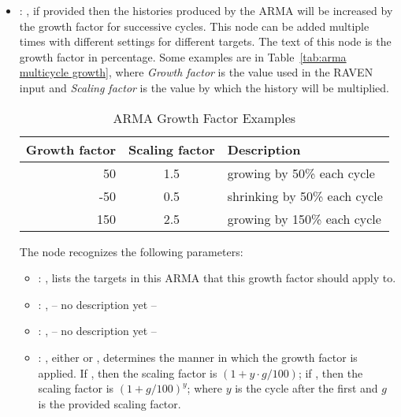 \begin{itemize}
\begin{itemize}
        \item {}: ,
          if provided then the histories produced by
          the ARMA will be increased by the growth factor for successive cycles. This node can be
          added                                                    multiple times with different
          settings for different targets.                                                    The
          text of this node is the growth factor in percentage. Some examples are in
          Table~\ref{tab:arma multicycle growth}, where \emph{Growth factor} is the value used in
          the RAVEN                                                    input and \emph{Scaling
          factor} is the value by which the history will be multiplied.
          \begin{table}[h!]                                                      \centering
          \begin{tabular}{r c l}                                                        Growth
          factor & Scaling factor & Description \\ \hline
          50 & 1.5 & growing by 50\% each cycle \\
          -50 & 0.5 & shrinking by 50\% each cycle \\
          150 & 2.5 & growing by 150\% each cycle \\
          \end{tabular}                                                      \caption{ARMA Growth
          Factor Examples}                                                      \label{tab:arma
          multicycle growth}                                                    \end{table}
          The  node recognizes the following parameters:
            \begin{itemize}
              \item {}: ,
                lists the targets                     in this ARMA that this growth factor should
                apply to.
              \item {}: ,
                -- no description yet --
              \item {}: ,
                -- no description yet --
              \item {}: ,
                either  or                     , determines
                the manner in which the growth factor is applied.                     If
                , then the scaling factor is $(1+y\cdot g/100)$;
                if , then the scaling factor is $(1+g/100)^y$;
                where $y$ is the cycle after the first and $g$ is the provided scaling factor.
          \end{itemize}
      \end{itemize}


\end{itemize}
